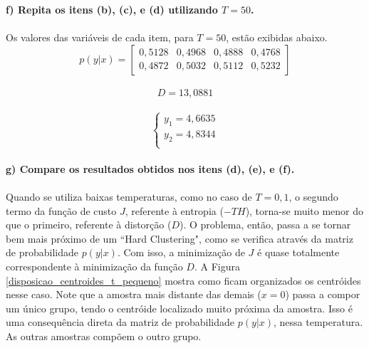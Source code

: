 \documentclass{report}
\begin{document}
\textbf{f) Repita os itens (b), (c), e (d) utilizando $T = 50$.}\\

\paragraph{} Os valores das variáveis de cada item, para $T = 50$, estão exibidas abaixo.\\

\begin{equation*}
p(y|x) = \left[\begin{array}{cccc}
0,5128 & 0,4968 & 0,4888 & 0,4768 \\ 
0,4872 & 0,5032 & 0,5112 & 0,5232
\end{array} \right]
\end{equation*}\\

\begin{equation*}
D = 13,0881
\end{equation*}\\

\begin{equation*}
\begin{cases}
	y_1 = 4,6635\\
	y_2 = 4,8344\\
\end{cases}
\end{equation*}\\

\textbf{g) Compare os resultados obtidos nos itens (d), (e), e (f).}\\

\paragraph{} Quando se utiliza baixas temperaturas, como no caso de $T = 0,1$, o segundo termo da função de custo $J$, referente à entropia ($-TH$), torna-se muito menor do que o primeiro, referente à distorção ($D$). O problema, então, passa a se tornar bem mais próximo de um ``Hard Clustering", como se verifica através da matriz de probabilidade $p(y|x)$. Com isso, a minimização de $J$ é quase totalmente correspondente à minimização da função $D$. A Figura \ref{disposicao_centroides_t_pequeno} mostra como ficam organizados os centróides nesse caso. Note que a amostra mais distante das demais ($x = 0$) passa a compor um único grupo, tendo o centróide localizado muito próxima da amostra. Isso é uma consequência direta da matriz de probabilidade $p(y|x)$, nessa temperatura. As outras amostras compõem o outro grupo.\\
\end{document}
